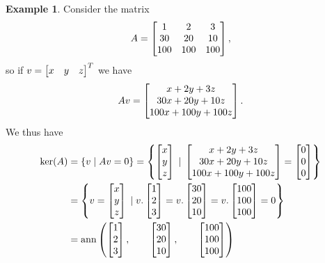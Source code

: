 \documentclass[reqno]{amsart}
\theoremstyle{definition}
\newtheorem{example}[theorem]{Example}
\begin{document}
\begin{example}\label{eg-ker-ann}
 Consider the matrix
 \[ A = \left[\begin{matrix} 1 & 2 & 3 \\ 30 & 20 & 10 \\ 100 & 100 & 100 \end{matrix}\right], \]
 so if $v=\left[\begin{matrix} x & y & z \end{matrix}\right]^T$ we have
 \[ A v = \left[\begin{matrix} x+2y+3z \\ 30x+20y+10z \\ 100x+100y+100z \end{matrix}\right]. \]
 We thus have 
 \begin{align*}
  \ker(A) &= \{v\;|\; Av=0\} 
   = \left\{\left[\begin{matrix} x \\ y \\ z\end{matrix}\right] \;|\;
       \left[\begin{matrix} x+2y+3z \\ 30x+20y+10z \\ 100x+100y+100z \end{matrix}\right] = 
       \left[\begin{matrix} 0 \\ 0 \\ 0 \end{matrix}\right] \right\} \\
  &= \left\{v = \left[\begin{matrix} x \\ y \\ z\end{matrix}\right] \;|\;
        v . \left[\begin{matrix} 1\\2\\3\end{matrix}\right] =
        v . \left[\begin{matrix} 30\\20\\10\end{matrix}\right] =
        v . \left[\begin{matrix} 100\\100\\100\end{matrix}\right] = 0
       \right\} \\
  &= \operatorname{ann}\left(
        \left[\begin{matrix} 1\\2\\3\end{matrix}\right],\qquad
        \left[\begin{matrix} 30\\20\\10\end{matrix}\right],\qquad
        \left[\begin{matrix} 100\\100\\100\end{matrix}\right]
       \right)
 \end{align*}
\end{example}
\end{document}
